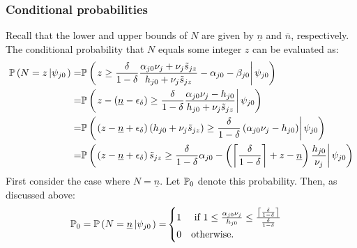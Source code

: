 \subsubsection*{Conditional probabilities}

Recall that the lower and upper bounds of $N$ are given by $\underline{n}$ and $\overline{n}$, respectively. 
The conditional probability that $N$ equals some integer $z$ can be evaluated as:
\begin{align}
    \PP \pr{\crs{
        N = z
    }{\psi_{j0}}}
    =&
    \nonumber
    \PP \pr{\cls{
        z 
        \geq 
        \frac{\delta}{1 - \delta}
        \frac{\alpha_{j0} \nu_j + \nu_j \ks[z]}{h_{j0} + \nu_j \ks[z]} -\alpha_{j0} - \beta_{j0}
    }{\psi_{j0}}}
    \\
    \nonumber
    =&
    \PP \pr{\cls{
        z - \pr{\underline{n} - \epsilon_\delta}
        \geq
        \frac{\delta}{1 - \delta}
        \frac{\alpha_{j0} \nu_j - h_{j0}}{h_{j0} + \nu_j \ks[z]}
    }{\psi_{j0}}} 
    \\
    =&
    \PP \pr{\cls{
        \pr{z - \underline{n} + \epsilon_\delta}
        \pr{h_{j0} + \nu_j \ks[z]}
        \geq
        \frac{\delta}{1 - \delta}
        \pr{\alpha_{j0} \nu_j - h_{j0}}
    }{\psi_{j0}}} 
    \\
    =&
    \PP \pr{\cls{
        \pr{z - \underline{n} + \epsilon_\delta}
        \ks[z]
        \geq
        \frac{\delta}{1 - \delta} \alpha_{j0}
        -
        \pr{\ddelta + z - \underline{n}}
        \frac{h_{j0}}{\nu_j}
    }{\psi_{j0}}} 
\end{align}
First consider the case where $N = \underline{n}$. Let $\PP_0$ denote this probability. Then, as discussed above:
\begin{align*}
    \PP_0 = \PP \pr{\crs{
        N = \underline{n}
    }{\psi_{j0}}}
    =&
    \begin{cases}
    1 &\text{ if } 1 \leq \frac{\alpha_{j0} \nu_j}{h_{j0}} \leq \frac{\ddelta}{\frac{\delta}{1 - \delta}}
    \\
    0 &\text{otherwise}.
    \end{cases}
\end{align*} 

